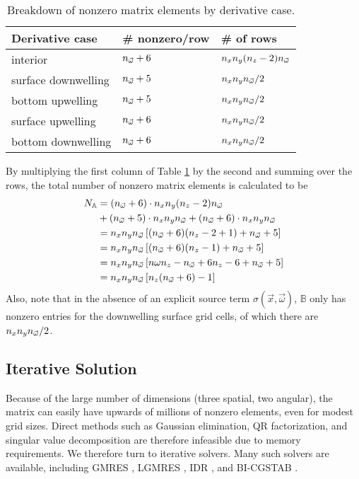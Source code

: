 \begin{table}[H]
  \centering
  \caption{Breakdown of nonzero matrix elements by derivative case.}
  \begin{tabular}{p{}p{}p{}}
    \toprule
    \textbf{Derivative case} & \textbf{\# nonzero/row} & \textbf{\# of rows} \\
    \midrule
    interior & ${n_{\vec{\omega}}}+6$ & $n_xn_y(n_z-2){n_{\vec{\omega}}}$ \\
    surface downwelling & ${n_{\vec{\omega}}}+5$ & $n_xn_y{n_{\vec{\omega}}}/2$ \\
    bottom upwelling & ${n_{\vec{\omega}}}+5$ & $n_xn_y{n_{\vec{\omega}}}/2$ \\
    surface upwelling & ${n_{\vec{\omega}}}+6$ & $n_xn_y{n_{\vec{\omega}}}/2$ \\
    bottom downwelling & ${n_{\vec{\omega}}}+6$ & $n_xn_y{n_{\vec{\omega}}}/2$ \\
    \bottomrule
  \end{tabular}
  \label{tab:nonzero}
\end{table}

By multiplying the first column of Table \ref{tab:nonzero} by the second and summing over the rows, the total number of nonzero matrix elements is calculated to be
\begin{align*}
  N_\mathbb{A} &= ({n_{\vec{\omega}}}+6) \cdot n_xn_y(n_z-2){n_{\vec{\omega}}} \\
    &+   ({n_{\vec{\omega}}}+5) \cdot n_xn_y{n_{\vec{\omega}}}
    +   ({n_{\vec{\omega}}}+6) \cdot n_xn_y{n_{\vec{\omega}}} \\
  &= n_x n_y {n_{\vec{\omega}}} \left[({n_{\vec{\omega}}}+6)(n_z-2+1)+{n_{\vec{\omega}}}+5 \right] \\
  &= n_x n_y {n_{\vec{\omega}}} \left[({n_{\vec{\omega}}}+6)(n_z-1)+{n_{\vec{\omega}}}+5 \right] \\
  &=  n_x n_y {n_{\vec{\omega}}} \left[n\omega n_z -{n_{\vec{\omega}}} + 6n_z - 6 + {n_{\vec{\omega}}} + 5 \right] \\
  &=  n_x n_y {n_{\vec{\omega}}} \left[n_z({n_{\vec{\omega}}}+6)-1\right]
\end{align*}
Also, note that in the absence of an explicit source term $\sigma(\vec{x}, \vec{\omega})$, $\mathbb{B}$ only has nonzero entries for the downwelling surface grid cells, of which there are $n_x n_y {n_{\vec{\omega}}}/2$.

\subsection{Iterative Solution}
Because of the large number of dimensions (three spatial, two angular), the matrix can easily have upwards of millions of nonzero elements,
even for modest grid sizes.
Direct methods such as Gaussian elimination, QR factorization, and singular value decomposition are therefore infeasible due to memory requirements.
We therefore turn to iterative solvers.
Many such solvers are available, including GMRES \cite{saad_gmres:_1985}, LGMRES \cite{baker_technique_2005}, IDR \cite{sonneveld_idrs:_2008}, and BI-CGSTAB \cite{van_der_vorst_bi-cgstab:_1992}.

